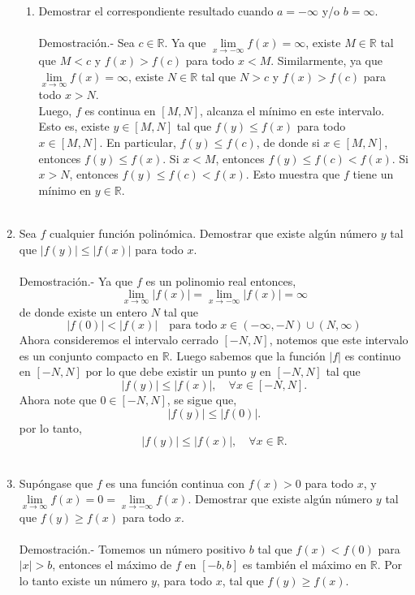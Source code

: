 \begin{enumerate}
\begin{enumerate}[\bfseries (a)]
	\item Demostrar el correspondiente resultado cuando $a=-\infty$ y/o $b=\infty$.\\\\
	    Demostración.-\; Sea $c\in \mathbb{R}$. Ya que $\lim\limits_{x\to -\infty}f(x) = \infty$, existe $M\in \mathbb{R}$ tal que $M<c$ y $f(x)>f(c)$ para todo $x<M.$ Similarmente, ya que $\lim\limits_{x\to \infty} f(x)=\infty$, existe $N\in \mathbb{R}$ tal que $N>c$ y $f(x)>f(c)$ para todo $x>N$.\\
	    Luego, $f$ es continua en $[M,N]$, alcanza el mínimo en este intervalo. Esto es, existe $y\in [M,N]$ tal que $f(y)\leq f(x)$ para todo $x\in [M,N]$. En particular, $f(y)\leq f(c)$, de donde si $x\in [M,N]$, entonces $f(y)\leq f(x).$ Si $x<M$, entonces $f(y)\leq f(c)<f(x).$ Si $x>N$, entonces $f(y)\leq f(c)<f(x).$ Esto muestra que $f$ tiene un mínimo en $y \in \mathbb{R}.$\\\\

    \end{enumerate}

\item Sea $f$ cualquier función polinómica. Demostrar que existe algún número $y$ tal que $|f(y)|\leq |f(x)|$ para todo $x$.\\\\
    Demostración.-\; Ya que $f$ es un polinomio real entonces,
    $$\lim_{x\to \infty} |f(x)|=\lim_{x\to -\infty}|f(x)|=\infty$$
    de donde existe un entero $N$ tal que 
    $$|f(0)|<|f(x)|\quad \mbox{para todo}\; x\in (-\infty,-N)\cup(N,\infty)$$
    Ahora consideremos el intervalo cerrado $[-N,N]$, notemos que este intervalo es un conjunto compacto en $\mathbb{R}$. Luego sabemos que la función $|f|$ es continuo en $[-N,N]$ por lo que debe existir un punto $y$ en $[-N,N]$ tal que 
    $$|f(y)|\leq |f(x)|,\quad \forall x\in [-N,N].$$
    Ahora note que $0 \in [-N,N]$, se sigue que,
    $$|f(y)|\leq |f(0)|.$$
    por lo tanto,
    $$|f(y)|\leq |f(x)|,\quad \forall x\in \mathbb{R}.$$\\

\item Supóngase que $f$ es una función continua con $f(x)>0$ para todo $x$, y $\lim\limits_{x\to \infty} f(x)=0 = \lim\limits_{x\to -\infty} f(x)$. Demostrar que existe algún número $y$ tal que $f(y)\geq f(x)$ para todo $x$.\\\\
    Demostración.-\; Tomemos un número positivo $b$ tal que $f(x)<f(0)$ para $|x|>b$, entonces el máximo de $f$ en $[-b,b]$ es también el máximo en $\mathbb{R}.$ Por lo tanto existe un número $y$, para todo $x$, tal que $f(y)\geq f(x).$\\\\


\end{enumerate}
